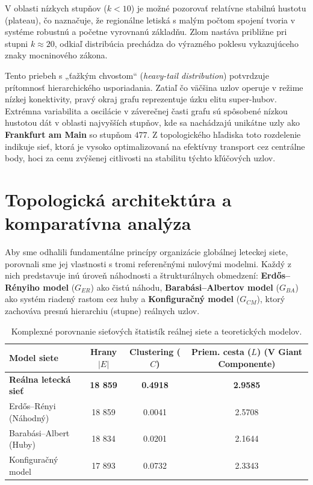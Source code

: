 V oblasti nízkych stupňov ($k < 10$) je možné pozorovať relatívne stabilnú hustotu (plateau), čo naznačuje, že regionálne letiská s malým počtom
spojení tvoria v systéme robustnú a početne vyrovnanú základňu. Zlom nastáva približne pri stupni $k \approx 20$, odkiaľ distribúcia prechádza do
výrazného poklesu vykazujúceho znaky mocninového zákona.

Tento priebeh s „ťažkým chvostom“ (\textit{heavy-tail distribution}) potvrdzuje prítomnosť hierarchického usporiadania. Zatiaľ čo väčšina uzlov
operuje v režime nízkej konektivity, pravý okraj grafu reprezentuje úzku elitu super-hubov. Extrémna variabilita a oscilácie v záverečnej časti grafu
sú spôsobené nízkou hustotou dát v oblasti najvyšších stupňov, kde sa nachádzajú unikátne uzly ako \textbf{Frankfurt am Main} so stupňom $477$.
Z topologického hľadiska toto rozdelenie indikuje sieť, ktorá je vysoko optimalizovaná na efektívny transport cez centrálne body, hoci za cenu
zvýšenej citlivosti na stabilitu týchto kľúčových uzlov.

\section{Topologická architektúra a komparatívna analýza}

Aby sme odhalili fundamentálne princípy organizácie globálnej leteckej siete, porovnali sme jej vlastnosti s tromi referenčnými nulovými modelmi.
Každý z nich predstavuje inú úroveň náhodnosti a štrukturálnych obmedzení: \textbf{Erdős–Rényiho model} ($G_{ER}$) ako čistú náhodu,
\textbf{Barabási–Albertov model} ($G_{BA}$) ako systém riadený rastom cez huby a \textbf{Konfiguračný model} ($G_{CM}$), ktorý zachováva presnú
hierarchiu (stupne) reálnych uzlov.

\begin{table}[H]
    \centering
    \caption{Komplexné porovnanie sieťových štatistík reálnej siete a teoretických modelov.}
    \label{tab:model_comparison}
    \begin{tabular}{lccc}
        \hline \textbf{Model siete}         & \textbf{Hrany $|E|$} & \textbf{Clustering ($C$)} & 
        \makecell[c]{\textbf{Priem. cesta ($L$)} \\ \small (V Giant Componente)}\\
        \hline \textbf{Reálna letecká sieť} & \textbf{18 859}      & \textbf{0.4918}           & \textbf{2.9585}             \\
        Erdős–Rényi (Náhodný)               & 18 859               & 0.0041                    & 2.5708                      \\
        Barabási–Albert (Huby)              & 18 834               & 0.0201                    & 2.1644                      \\
        Konfiguračný model                  & 17 893               & 0.0732                    & 2.3343                      \\
        \hline
    \end{tabular}
\end{table}

